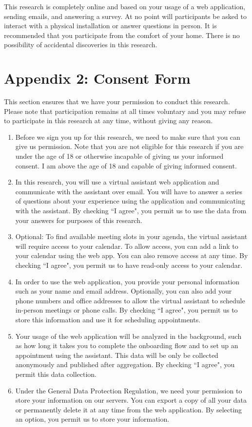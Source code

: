 \documentclass{article}
\begin{document}
This research is completely online and based on your usage of a web application, sending emails, and answering a survey. At no point will participants be asked to interact with a physical installation or answer questions in person. It is recommended that you participate from the comfort of your home. There is no possibility of accidental discoveries in this research.

\newpage

\section*{Appendix 2: Consent Form}

This section ensures that we have your permission to conduct this research. Please note that participation remains at all times voluntary and you may refuse to participate in this research at any time, without giving any reason.

\begin{enumerate}
	\item Before we sign you up for this research, we need to make sure that you can give us permission. Note that you are not eligible for this research if you are under the age of 18 or otherwise incapable of giving us your informed consent. I am above the age of 18 and capable of giving informed consent.
	\item In this research, you will use a virtual assistant web application and communicate with the assistant over email. You will have to answer a series of questions about your experience using the application and communicating with the assistant. By checking ``I agree", you permit us to use the data from your answers for purposes of this research.
	\item Optional: To find available meeting slots in your agenda, the virtual assistant will require access to your calendar. To allow access, you can add a link to your calendar using the web app. You can also remove access at any time. By checking ``I agree", you permit us to have read-only access to your calendar.
	\item In order to use the web application, you provide your personal information such as your name and email address. Optionally, you can also add your phone numbers and office addresses to allow the virtual assistant to schedule in-person meetings or phone calls. By checking ``I agree", you permit us to store this information and use it for scheduling appointments.
	\item Your usage of the web application will be analyzed in the background, such as how long it takes you to complete the onboarding flow and to set up an appointment using the assistant. This data will be only be collected anonymously and published after aggregation. By checking ``I agree", you permit this data collection.
	\item Under the General Data Protection Regulation, we need your permission to store your information on our servers. You can export a copy of all your data or permanently delete it at any time from the web application. By selecting an option, you permit us to store your information.
\end{enumerate}
\end{document}
